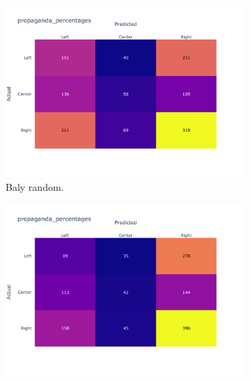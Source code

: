 \begin{figure}[!htbp]
    \centering
     \begin{subfigure}[b]{0.48\linewidth}
         \centering
         \includegraphics[width=\linewidth]{figures/baly_random_confusion_matrix_propaganda_percentages-small.pdf}
         \caption{Baly random.}
         \label{fig:prop_tech_confusion_baly_random}
     \end{subfigure}
    \begin{subfigure}[b]{0.48\linewidth}
         \centering 
         \includegraphics[width=\linewidth]{figures/baly_media_confusion_matrix_propaganda_percentages-small.pdf}

\end{subfigure}
\end{figure}
